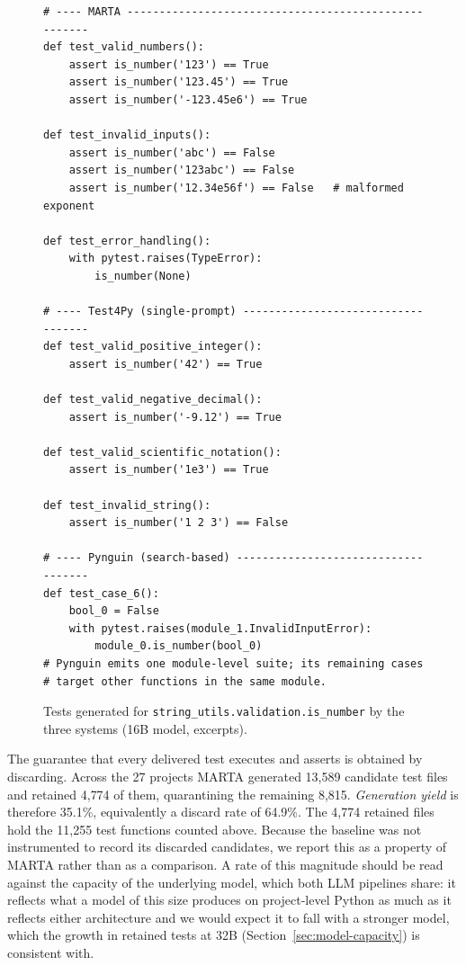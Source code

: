 \documentclass{llncs}
\begin{document}
\begin{figure}[b]
\centering
\begin{lstlisting}[basicstyle=\ttfamily\scriptsize, breaklines=true, frame=single, backgroundcolor=\color{gray!5}]
# ---- MARTA -----------------------------------------------------
def test_valid_numbers():
    assert is_number('123') == True
    assert is_number('123.45') == True
    assert is_number('-123.45e6') == True

def test_invalid_inputs():
    assert is_number('abc') == False
    assert is_number('123abc') == False
    assert is_number('12.34e56f') == False   # malformed exponent

def test_error_handling():
    with pytest.raises(TypeError):
        is_number(None)

# ---- Test4Py (single-prompt) -----------------------------------
def test_valid_positive_integer():
    assert is_number('42') == True

def test_valid_negative_decimal():
    assert is_number('-9.12') == True

def test_valid_scientific_notation():
    assert is_number('1e3') == True

def test_invalid_string():
    assert is_number('1 2 3') == False

# ---- Pynguin (search-based) ------------------------------------
def test_case_6():
    bool_0 = False
    with pytest.raises(module_1.InvalidInputError):
        module_0.is_number(bool_0)
# Pynguin emits one module-level suite; its remaining cases
# target other functions in the same module.
\end{lstlisting}
\caption{Tests generated for \texttt{string\_utils.validation.is\_number} by the three systems (16B model, excerpts).}
\label{fig:oracles-example}
\end{figure}


The guarantee that every delivered test executes and asserts is obtained by
discarding. Across the 27 projects MARTA generated 13{,}589 candidate test files and retained
4{,}774 of them, quarantining the remaining 8{,}815. \emph{Generation yield} is therefore
35.1\%, equivalently a discard rate of 64.9\%. The 4{,}774 retained files hold the
11{,}255 test functions counted above. Because the baseline was not instrumented to
record its discarded candidates, we report this as a property of MARTA rather than as
a comparison. A rate of this
magnitude should be read against the capacity of the underlying model, which both LLM
pipelines share: it reflects what a model of this size produces on project-level
Python as much as it reflects either architecture and we would expect it to fall
with a stronger model, which the growth in retained tests at 32B
(Section~\ref{sec:model-capacity}) is consistent with.
\end{document}
